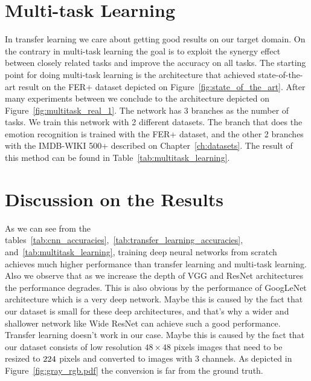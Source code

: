 \section{Multi-task Learning}
In transfer learning we care about getting good results on our target domain. On the contrary in multi-task learning the goal is to exploit the synergy effect between closely related tasks and improve the accuracy on all tasks. The starting point for doing multi-task learning is the architecture that achieved state-of-the-art result on the FER+ dataset depicted on Figure~\ref{fig:state_of_the_art}. After many experiments between we conclude to the architecture depicted on Figure~\ref{fig:multitask_real_1}. The network has 3 branches as the number of tasks. We train this network with 2 different datasets. The branch that does the emotion recognition is trained with the FER+ dataset, and the other 2 branches with the IMDB-WIKI 500+ described on Chapter~\ref{ch:datasets}. The result of this method can be found in Table~\ref{tab:multitask_learning}.

\section{Discussion on the Results}
As we can see from the tables~\ref{tab:cnn_accuracies},~\ref{tab:transfer_learning_accuracies}, and~\ref{tab:multitask_learning}, training deep neural networks from scratch achieves much higher performance than transfer learning and multi-task learning. Also we observe that as we increase the depth of VGG and ResNet architectures the performance degrades. This is also obvious by the performance of GoogLeNet architecture which is a very deep network. Maybe this is caused by the fact that our dataset is small for these deep architectures, and that's why a wider and shallower network like Wide ResNet can achieve such a good performance. Transfer learning doesn't work in our case. Maybe this is caused by the fact that our dataset consists of low resolution $48\times 48$ pixels images that need to be resized to $224\time 224$ pixels and converted to images with 3 channels. As depicted in Figure~\ref{fig:gray_rgb.pdf} the conversion is far from the ground truth.

